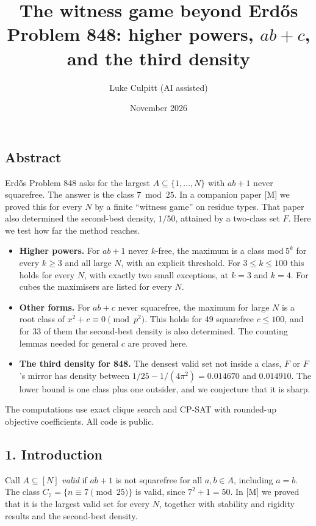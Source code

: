 \documentclass[
  11pt,
]{article}
\title{The witness game beyond Erd\H{o}s Problem 848: higher powers,
\(ab+c\), and the third density}
\author{Luke Culpitt (AI assisted)}
\date{November 2026}
\providecommand{\tightlist}{%
  \setlength{\itemsep}{0pt}\setlength{\parskip}{0pt}}
\begin{document}
\maketitle

\subsection{Abstract}

Erdős Problem 848 asks for the largest \(A \subseteq \{1, \dots, N\}\)
with \(ab + 1\) never squarefree. The answer is the class
\(7 \bmod 25\). In a companion paper {[}M{]} we proved this for every
\(N\) by a finite ``witness game'' on residue types. That paper also
determined the second-best density, \(1/50\), attained by a two-class
set \(F\). Here we test how far the method reaches.

\begin{itemize}
\tightlist
\item
  \textbf{Higher powers.} For \(ab + 1\) never \(k\)-free, the maximum
  is a class \(\mathrm{mod}\ 5^k\) for every \(k \ge 3\) and all large
  \(N\), with an explicit threshold. For \(3 \le k \le 100\) this holds
  for every \(N\), with exactly two small exceptions, at \(k = 3\) and
  \(k = 4\). For cubes the maximisers are listed for every \(N\).
\item
  \textbf{Other forms.} For \(ab + c\) never squarefree, the maximum for
  large \(N\) is a root class of \(x^2 + c \equiv 0 \pmod{p^2}\). This
  holds for 49 squarefree \(c \le 100\), and for 33 of them the
  second-best density is also determined. The counting lemmas needed for
  general \(c\) are proved here.
\item
  \textbf{The third density for 848.} The densest valid set not inside a
  class, \(F\) or \(F\)'s mirror has density between
  \(1/25 - 1/(4\pi^2) = 0.014670\) and \(0.014910\). The lower bound is
  one class plus one outsider, and we conjecture that it is sharp.
\end{itemize}

The computations use exact clique search and CP-SAT with rounded-up
objective coefficients. All code is public.

\subsection{1. Introduction}

Call \(A \subseteq [N]\) \emph{valid} if \(ab + 1\) is not squarefree
for all \(a, b \in A\), including \(a = b\). The class
\(C_7 = \{n \equiv 7 \pmod{25}\}\) is valid, since \(7^2 + 1 = 50\). In
{[}M{]} we proved that it is the largest valid set for every \(N\),
together with stability and rigidity results and the second-best
density.
\end{document}
